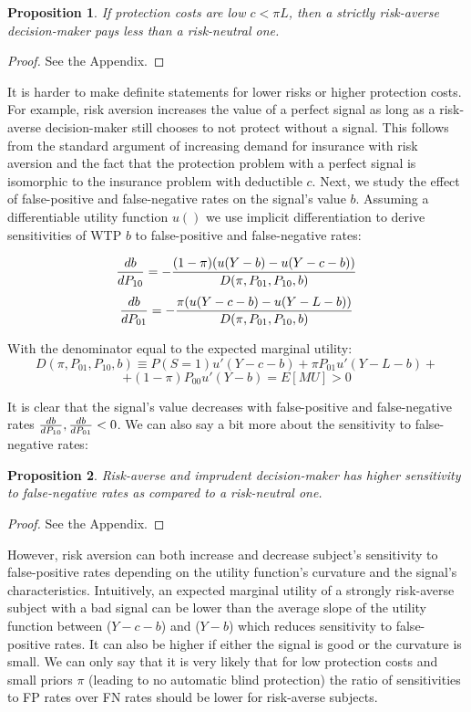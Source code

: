 \documentclass[12pt,a4paper]{article}
\newtheorem{theorem}{Proposition}
\begin{document}
\begin{theorem}
 If protection costs are low $c<\pi L$, then a strictly risk-averse decision-maker pays less than a risk-neutral one.
\end{theorem} 
\begin{proof}
See the Appendix.
\end{proof}

It is harder to make definite statements for lower risks or higher protection costs. For example, risk aversion increases the value of a perfect signal as long as a risk-averse decision-maker still chooses to not protect without a signal. This follows from the standard argument of increasing demand for insurance with risk aversion and the fact that the protection problem with a perfect signal is isomorphic to the insurance problem with deductible $c$. 
Next, we study the effect of false-positive and false-negative rates on the signal's value $b$. Assuming a differentiable utility function $u()$ we use implicit differentiation to derive sensitivities of WTP $b$ to false-positive and false-negative rates:

$${db\over dP_{10}}=-{(1-\pi)(u(Y-b)-u(Y-c-b))\over D(\pi, P_{01}, P_{10}, b)}$$
$${db\over dP_{01}}=-{\pi(u(Y-c-b)-u(Y-L-b))\over D(\pi, P_{01}, P_{10}, b)}$$

With the denominator equal to the expected marginal utility:
$$D(\pi, P_{01}, P_{10}, b)\equiv P(S=1)u'(Y-c-b)+\pi P_{01}u'(Y-L-b)+$$
$$+(1-\pi)P_{00}u'(Y-b)=E[MU]>0$$

It is clear that the signal's value decreases with false-positive and false-negative rates ${db\over dP_{10}},{db\over dP_{01}}<0$. We can also say a bit more about the sensitivity to false-negative rates:
\begin{theorem}
Risk-averse and imprudent decision-maker has higher sensitivity to false-negative rates as compared to a risk-neutral one.
\end{theorem}\label{thm:riskAverse}  
\begin{proof}
See the Appendix.
\end{proof}

However, risk aversion can both increase and decrease subject's sensitivity to false-positive rates depending on the utility function's curvature and the signal's characteristics. Intuitively, an expected marginal utility of a strongly risk-averse subject with a bad signal can be lower than the average slope of the utility function between ($Y-c-b$) and ($Y-b$) which reduces sensitivity to false-positive rates. It can also be higher if either the signal is good or the curvature is small. We can only say that it is very likely that for low protection costs and small priors $\pi$ (leading to no automatic blind protection) the ratio of sensitivities to FP rates over FN rates should be lower for risk-averse subjects. 
\end{document}
